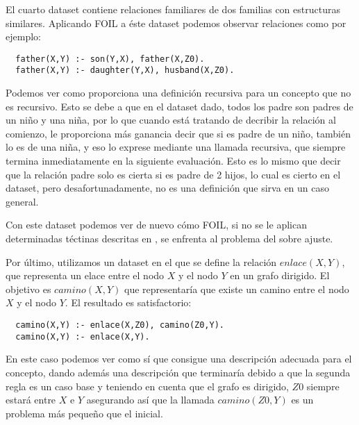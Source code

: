 El cuarto dataset contiene relaciones familiares de dos familias con estructuras similares. Aplicando FOIL a éste dataset podemos observar relaciones como por ejemplo:

\begin{lstlisting}
  father(X,Y) :- son(Y,X), father(X,Z0).
  father(X,Y) :- daughter(Y,X), husband(X,Z0).
\end{lstlisting}

Podemos ver como proporciona una definición recursiva para un concepto que no es recursivo. Esto se debe a que en el dataset dado, todos los padre son padres de un niño y una niña, por lo que cuando está tratando de decribir la relación al comienzo, le proporciona más ganancia decir que si es padre de un niño, también lo es de una niña, y eso lo exprese mediante una llamada recursiva, que siempre termina inmediatamente en la siguiente evaluación. Esto es lo mismo que decir que la relación padre solo es cierta si es padre de 2 hijos, lo cual es cierto en el dataset, pero desafortunadamente, no es una definición que sirva en un caso general.

Con este dataset podemos ver de nuevo cómo FOIL, si no se le aplican determinadas téctinas descritas en \cite{Quinlan1995}, se enfrenta al problema del sobre ajuste.

Por último, utilizamos un dataset en el que se define la relación $enlace(X,Y)$, que representa un elace entre el nodo $X$ y el nodo $Y$ en un grafo dirigido.
El objetivo es $camino(X,Y)$ que representaría que existe un camino entre el nodo $X$ y el nodo $Y$.
El resultado es satisfactorio:

\begin{lstlisting}
  camino(X,Y) :- enlace(X,Z0), camino(Z0,Y).
  camino(X,Y) :- enlace(X,Y).
\end{lstlisting}

En este caso podemos ver como sí que consigue una descripción adecuada para el concepto, dando además una descripción que terminaría debido a que la segunda regla es un caso base y teniendo en cuenta que el grafo es dirigido, $Z0$ siempre estará entre $X$ e $Y$ asegurando así que la llamada $camino(Z0,Y)$ es un problema más pequeño que el inicial.
